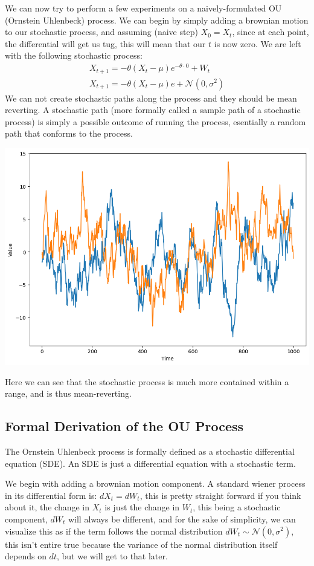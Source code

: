 \documentclass{article}
\begin{document}
\begin{spacing}{2.0}
We can now try to perform a few experiments on a naively-formulated OU (Ornstein Uhlenbeck) process. We can begin by simply adding a brownian motion to our stochastic
process, and assuming (naive step) $X_{0} = X_{t}$, since at each point, the differential will get us tug, this will mean that our $t$ is now zero.
We are left with the following stochastic process:
\begin{gather*}
    X_{t + 1} = -\theta(X_{t} - \mu)e^{-\theta \cdot 0} + W_{t} \\
    X_{t + 1} = -\theta(X_{t} - \mu)e + \mathcal{N}(0, \sigma^{2})
\end{gather*}
We can not create stochastic paths along the process and they should be mean reverting. A stochastic path (more formally called a sample path of a stochastic process) is simply
a possible outcome of running the process, esentially a random path that conforms to the process.
\begin{center}
    \includegraphics[scale=0.35]{./images/naive_ou.png}
\end{center}
Here we can see that the stochastic process is much more contained within a range, and is thus mean-reverting.

\subsection{Formal Derivation of the OU Process}

The Ornstein Uhlenbeck process is formally defined as a stochastic differential equation (SDE). An SDE is just a differential equation with a stochastic term.

We begin with adding a brownian motion component. A standard wiener process in its differential form is: $dX_{t} = dW_{t}$, this is pretty straight forward if you think about it,
the change in $X_{t}$ is just the change in $W_{t}$, this being a stochastic component, $dW_{t}$ will always be different, and for the sake of simplicity, we can visualize this as if
the term follows the normal distribution $dW_{t} \sim \mathcal{N}(0, \sigma^2)$, this isn't entire true because the variance of the normal distribution itself depends on $dt$,
but we will get to that later.


\end{spacing}
\end{document}
